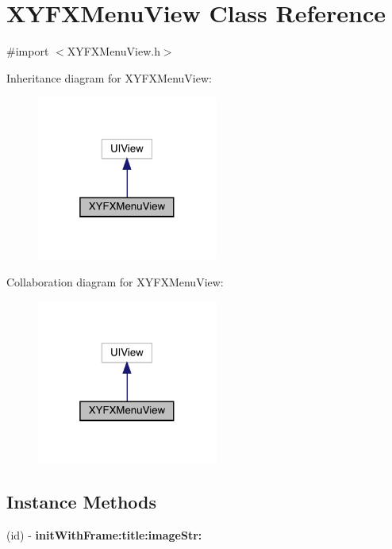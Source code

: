 \hypertarget{interface_x_y_f_x_menu_view}{}\section{X\+Y\+F\+X\+Menu\+View Class Reference}
\label{interface_x_y_f_x_menu_view}


{\ttfamily \#import $<$X\+Y\+F\+X\+Menu\+View.\+h$>$}



Inheritance diagram for X\+Y\+F\+X\+Menu\+View\+:\nopagebreak
\begin{figure}[H]
\begin{center}
\leavevmode
\includegraphics[width=169pt]{interface_x_y_f_x_menu_view__inherit__graph}
\end{center}
\end{figure}


Collaboration diagram for X\+Y\+F\+X\+Menu\+View\+:\nopagebreak
\begin{figure}[H]
\begin{center}
\leavevmode
\includegraphics[width=169pt]{interface_x_y_f_x_menu_view__coll__graph}
\end{center}
\end{figure}
\subsection*{Instance Methods}
\begin{DoxyCompactItemize}
\item 
\mbox{\label{interface_x_y_f_x_menu_view_a839e2fd9e64efcfebaaf77a1bd3597e9}} 
(id) -\/ {\bfseries init\+With\+Frame\+:title\+:image\+Str\+:}
\end{DoxyCompactItemize}


